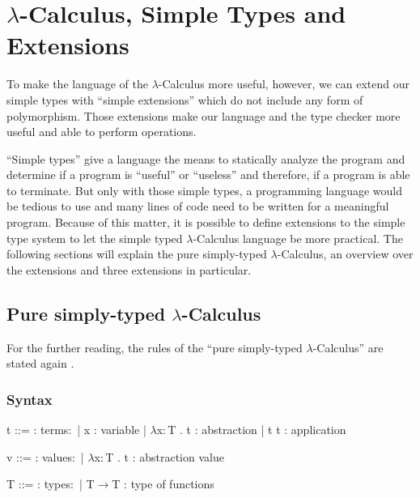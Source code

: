 \section{$\lambda$-Calculus, Simple Types and Extensions}
\label{sec:lambdaTypesExtensions}

To make the language of the $\lambda$-Calculus more useful, however, we can extend
our simple types with ``simple extensions'' which do not include any
form of polymorphism. Those extensions make our language and the type
checker more useful and able to perform operations.

``Simple types'' give a language the means to statically analyze the program
and determine if a program is ``useful'' or ``useless'' and therefore, if a
program is able to terminate. But only with those simple types, a programming
language would be tedious to use and many lines of code need to be written
for a meaningful program. Because of this matter, it is possible to define
extensions to the simple type system to let the simple typed $\lambda$-Calculus
language be more practical. The following sections will explain the
pure simply-typed $\lambda$-Calculus, an overview over the extensions and
three extensions in particular.

\subsection{Pure simply-typed $\lambda$-Calculus}

For the further reading, the rules of the ``pure simply-typed $\lambda$-Calculus''
are stated again \cite{pierce2002ProgLang}.

\subsubsection{Syntax}
\begin{bnfgrammar}
    t ::= : terms$\colon$
    | x : variable
    | $\lambda$x$\colon$T . t : abstraction
    | t t : application
\end{bnfgrammar}\leavevmode\newline

\begin{bnfgrammar}
    v ::= : values$\colon$
    | $\lambda$x$\colon$T . t : abstraction value
\end{bnfgrammar}\leavevmode\newline

\begin{bnfgrammar}
    T ::= : types$\colon$
    | T$\rightarrow$T : type of functions
\end{bnfgrammar}\leavevmode\newline

